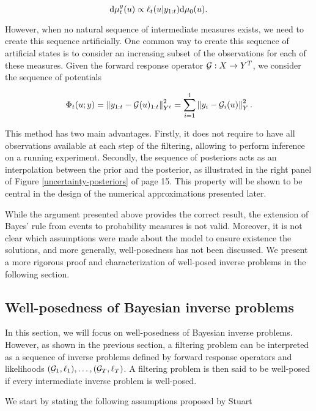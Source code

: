 \begin{equation*}
  \text{d}\mu_t^y(u) \propto \ell_t(u|y_{1:t})\text{d}\mu_0(u).
\end{equation*}

However, when no natural sequence of intermediate measures exists, we need to create this sequence artificially. One common way to create this sequence of artificial states is to consider an increasing subset of the observations for each of these measures. Given the forward response operator $\mathcal{G} : X \rightarrow Y^T$, we consider the sequence of potentials

\begin{equation}\label{phi-seq}
  \Phi_t(u; y) = \left\lVert y_{1:t} - \mathcal{G}(u)_{1:t}\right\rVert_{Y^t}^2 = \sum_{i=1}^t\left\lVert y_i - \mathcal{G}_i(u)\right\rVert_Y^2.
\end{equation}

This method has two main advantages. Firstly, it does not require to have all observations available at each step of the filtering, allowing to perform inference on a running experiment. Secondly, the sequence of posteriors acts as an interpolation between the prior and the posterior, as illustrated in the right panel of Figure \ref{uncertainty-posteriors} of page 15. This property will be shown to be central in the design of the numerical approximations presented later.

While the argument presented above provides the correct result, the extension of Bayes' rule from events to probability measures is not valid. Moreover, it is not clear which assumptions were made about the model to ensure existence the solutions, and more generally, well-posedness has not been discussed. We present a more rigorous proof and characterization of well-posed inverse problems in the following section.

\subsection{Well-posedness of Bayesian inverse problems}

In this section, we will focus on well-posedness of Bayesian inverse problems. However, as shown in the previous section, a filtering problem can be interpreted as a sequence of inverse problems defined by forward response operators and likelihoods $(\mathcal{G}_1, \ell_1), \ldots, (\mathcal{G}_T, \ell_T)$. A filtering problem is then said to be well-posed if every intermediate inverse problem is well-posed.


We start by stating the following assumptions proposed by Stuart \cite{stuart_2010}

